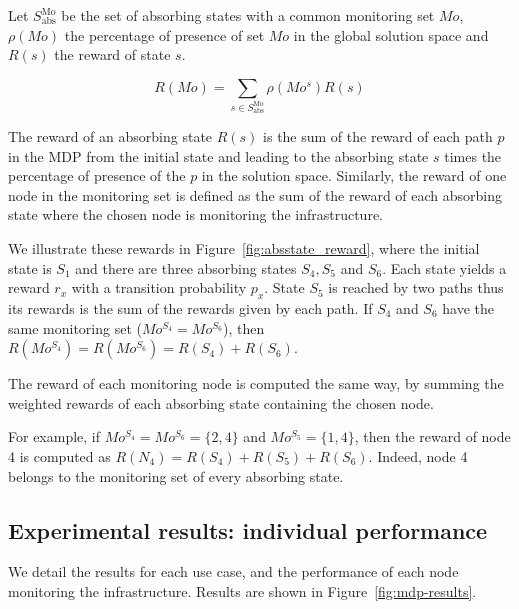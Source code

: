 Let $S^{\text{Mo}}_{\text{abs}}$ be the set of absorbing states with a common  monitoring set $Mo$, $\rho(Mo)$ the percentage of presence of set $Mo$ in the global solution space and $R(s)$ the reward of state $s$.

\begin{equation}
    R(Mo) = \sum\limits_{s \in S^{\text{Mo}}_{\text{abs}}}\rho(Mo^s)R(s)
\end{equation}


The reward of an absorbing state $R(s)$ is the sum of the reward of each path $p$ in the MDP from the initial state and leading to the absorbing state $s$ times the percentage of presence of the $p$ in the solution space. 
Similarly, the reward of one node in the monitoring set is defined as the sum of the reward of each absorbing state where the chosen node is monitoring the infrastructure.

We illustrate these rewards in Figure~\ref{fig:absstate_reward}, where the initial state is $S_1$ and there are three absorbing states $S_4,S_5$ and $S_6$. Each state yields a reward $r_x$ with a transition probability $p_x$.
State $S_5$ is reached by two paths thus its rewards is the sum of the rewards given by each path.
If $S_4$ and $S_6$ have the same monitoring set (\ie $Mo^{S_4} = Mo^{S_6}$), then $R(Mo^{S_4}) = R(Mo^{S_6}) = R(S_4) + R(S_6)$.


The reward of each monitoring node is computed the same way, by summing the weighted rewards of each absorbing state containing the chosen node.

For example, if $Mo^{S_4} = Mo^{S_6} =\{2,4\}$ and $Mo^{S_5} = \{1,4\}$, then the reward of node 4 is computed as $R(N_4) = R(S_4) + R(S_5) + R(S_6)$. Indeed, node 4 belongs to the monitoring set of every absorbing state.



\subsection{Experimental results: individual performance}
 We detail the results for each use case, and the performance of each node monitoring the infrastructure.
 Results are shown in Figure~\ref{fig:mdp-results}.

